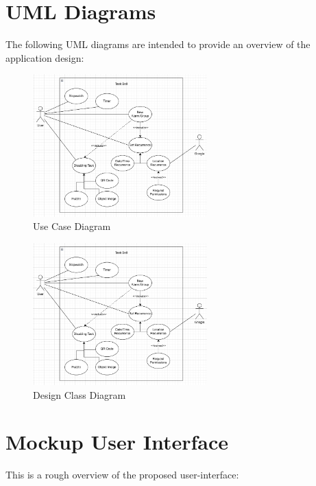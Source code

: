 \documentclass{article}
\begin{document}
\section{UML Diagrams}
The following UML diagrams are intended to provide an overview of the application design:
\begin{figure}[h!]
    \centering
    \includegraphics[width=0.6\textwidth, height=0.3\textheight]{../Use_Case_Diagram.png}
    \caption{Use Case Diagram}
    \label{fig:example_image}
\end{figure}
\begin{figure}[h!]
    \centering
    \includegraphics[width=0.6\textwidth, height=0.3\textheight]{../Use_Case_Diagram.png}
    \caption{Design Class Diagram}
    \label{fig:example_image}
\end{figure}

\section{Mockup User Interface}
This is a rough overview of the proposed user-interface:
\end{document}
